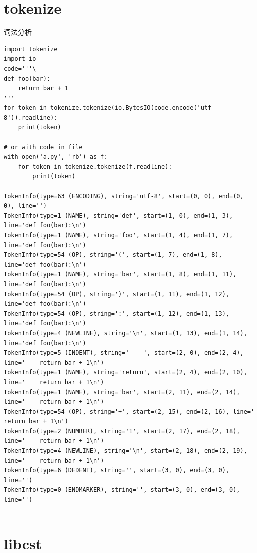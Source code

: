 \documentclass{beamer}
\let\oldfootnotesize\footnotesize
\renewcommand*{\footnotesize}{\oldfootnotesize\tiny}
\begin{document}
\section{tokenize}
\begin{frame}[t,fragile]{词法分析}
\footnotesize
\begin{verbatim}
import tokenize
import io
code='''\
def foo(bar):
    return bar + 1
'''
for token in tokenize.tokenize(io.BytesIO(code.encode('utf-8')).readline):
    print(token)

# or with code in file
with open('a.py', 'rb') as f:
    for token in tokenize.tokenize(f.readline):
        print(token)

TokenInfo(type=63 (ENCODING), string='utf-8', start=(0, 0), end=(0, 0), line='')
TokenInfo(type=1 (NAME), string='def', start=(1, 0), end=(1, 3), line='def foo(bar):\n')
TokenInfo(type=1 (NAME), string='foo', start=(1, 4), end=(1, 7), line='def foo(bar):\n')
TokenInfo(type=54 (OP), string='(', start=(1, 7), end=(1, 8), line='def foo(bar):\n')
TokenInfo(type=1 (NAME), string='bar', start=(1, 8), end=(1, 11), line='def foo(bar):\n')
TokenInfo(type=54 (OP), string=')', start=(1, 11), end=(1, 12), line='def foo(bar):\n')
TokenInfo(type=54 (OP), string=':', start=(1, 12), end=(1, 13), line='def foo(bar):\n')
TokenInfo(type=4 (NEWLINE), string='\n', start=(1, 13), end=(1, 14), line='def foo(bar):\n')
TokenInfo(type=5 (INDENT), string='    ', start=(2, 0), end=(2, 4), line='    return bar + 1\n')
TokenInfo(type=1 (NAME), string='return', start=(2, 4), end=(2, 10), line='    return bar + 1\n')
TokenInfo(type=1 (NAME), string='bar', start=(2, 11), end=(2, 14), line='    return bar + 1\n')
TokenInfo(type=54 (OP), string='+', start=(2, 15), end=(2, 16), line='    return bar + 1\n')
TokenInfo(type=2 (NUMBER), string='1', start=(2, 17), end=(2, 18), line='    return bar + 1\n')
TokenInfo(type=4 (NEWLINE), string='\n', start=(2, 18), end=(2, 19), line='    return bar + 1\n')
TokenInfo(type=6 (DEDENT), string='', start=(3, 0), end=(3, 0), line='')
TokenInfo(type=0 (ENDMARKER), string='', start=(3, 0), end=(3, 0), line='')


\end{verbatim}
    
\end{frame}
\label{sec:tokenize}

\section{libcst}
\label{sec:libcst}
\end{document}
